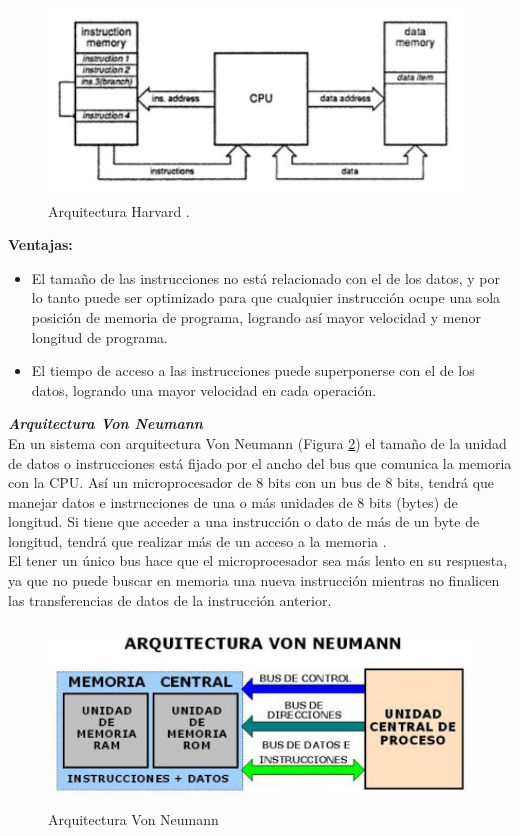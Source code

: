 \documentclass[12pt,a4paper]{article}
\begin{document}
   \begin{figure}[h]
   \centering
   \includegraphics[height=5cm]{Harvard}
   \caption{Arquitectura Harvard \cite{Muha}.}
   \label{fig:ArqHarvard}
   \end{figure}
   
   
   \textbf{Ventajas:}
   \begin{itemize}
   	\item El tamaño de las instrucciones no está relacionado con el de los datos, y por lo tanto puede ser optimizado para que cualquier instrucción ocupe una sola posición de memoria de programa, logrando así mayor velocidad y menor longitud de programa.
   	\item El tiempo de acceso a las instrucciones puede superponerse con el de los datos, logrando una mayor velocidad en cada operación.
   \end{itemize}
   
   \textbf{\textit{Arquitectura Von Neumann}}\\
   En un sistema con arquitectura Von Neumann (Figura \ref{fig:VonNeumann}) el tamaño de la unidad de datos o instrucciones está fijado por el ancho del bus que comunica la memoria con la CPU. Así un microprocesador de 8 bits con un bus de 8 bits, tendrá que manejar datos e instrucciones de una o más unidades de 8 bits (bytes) de longitud. Si tiene que acceder a una instrucción o dato de más de un byte de longitud, tendrá que realizar más de un acceso a la memoria \cite{Camacho}. \\
   El tener un único bus hace que el microprocesador sea más lento en su respuesta, ya que no puede buscar en memoria una nueva instrucción mientras no finalicen las transferencias de datos de la instrucción anterior.
   
   \begin{figure}[htpb]
   \centering
   \includegraphics[height=4.8cm]{VonNeumann}
   \caption{Arquitectura Von Neumann \cite{Carva}}
   \label{fig:VonNeumann}
   \end{figure}
    
\end{document}
